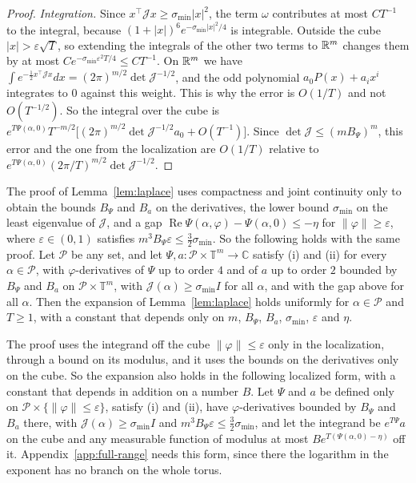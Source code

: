 \begin{proof}
\emph{Integration.} Since $x^\top\mathcal Jx\ge \sigma_{\min}|x|^2$, the term
$\omega$ contributes at most $CT^{-1}$ to the integral, because
$(1+|x|)^6e^{-\sigma_{\min}|x|^2/4}$ is integrable. Outside the cube
$|x|>\varepsilon\sqrt T$, so extending the integrals of the other two terms to
$\mathbb{R}^m$ changes them by at most $Ce^{-\sigma_{\min}\varepsilon^2T/4}\le CT^{-1}$. On
$\mathbb{R}^m$ we have
$\int e^{-\frac12x^\top\mathcal Jx}dx=(2\pi)^{m/2}\det\mathcal J^{-1/2}$, and
the odd polynomial $a_0P(x)+a_ix^i$ integrates to $0$ against this weight.
This is why the error
is $O(1/T)$ and not $O(T^{-1/2})$. So the integral over the cube is
$e^{T\Psi(\alpha,0)}T^{-m/2}\bigl[(2\pi)^{m/2}\det\mathcal J^{-1/2}a_0
+O(T^{-1})\bigr]$. Since $\det\mathcal J\le(mB_\Psi)^m$, this error and the
one from the localization are $O(1/T)$ relative to
$e^{T\Psi(\alpha,0)}(2\pi/T)^{m/2}\det\mathcal J^{-1/2}$.
\end{proof}

\begin{remark}\label{rem:laplace-uniform}
The proof of Lemma~\ref{lem:laplace} uses compactness and joint continuity only to obtain the bounds $B_\Psi$ and $B_a$ on
the derivatives, the lower bound $\sigma_{\min}$ on the least eigenvalue of $\mathcal J$, and a
gap $\operatorname{Re}\Psi(\alpha,\varphi)-\Psi(\alpha,0)\le-\eta$ for
$\lVert\varphi\rVert\ge\varepsilon$, where $\varepsilon\in(0,1)$ satisfies
$m^3B_\Psi\varepsilon\le\frac32\sigma_{\min}$. So the following holds with the same proof. Let
$\mathcal P$ be any set, and let $\Psi,a:\mathcal P\times\mathbb T^m\to\mathbb C$ satisfy (i) and
(ii) for every $\alpha\in\mathcal P$, with $\varphi$-derivatives of $\Psi$ up to order $4$ and
of $a$ up to order $2$ bounded by $B_\Psi$ and $B_a$ on $\mathcal P\times\mathbb T^m$, with
$\mathcal J(\alpha)\ge\sigma_{\min}I$ for all $\alpha$, and with the gap above for all $\alpha$.
Then the expansion of Lemma~\ref{lem:laplace} holds uniformly for $\alpha\in\mathcal P$ and
$T\ge1$, with a constant that depends only on $m$, $B_\Psi$, $B_a$, $\sigma_{\min}$,
$\varepsilon$ and $\eta$.

The proof uses the integrand off the cube $\lVert\varphi\rVert\le\varepsilon$ only in the
localization, through a bound on its modulus, and it uses the bounds on the derivatives only on
the cube. So the expansion also holds in the following localized form, with a constant that
depends in addition on a number $B$. Let $\Psi$ and $a$ be defined only on
$\mathcal P\times\{\lVert\varphi\rVert\le\varepsilon\}$, satisfy (i) and (ii), have
$\varphi$-derivatives bounded by $B_\Psi$ and $B_a$ there, with $\mathcal J(\alpha)\ge\sigma_{\min}I$
and $m^3B_\Psi\varepsilon\le\frac32\sigma_{\min}$, and let the integrand be
$e^{T\Psi}a$ on the cube and any measurable function of modulus at most
$Be^{T(\Psi(\alpha,0)-\eta)}$ off it. Appendix~\ref{app:full-range} needs this form, since
there the logarithm in the exponent has no branch on the whole torus.
\end{remark}


